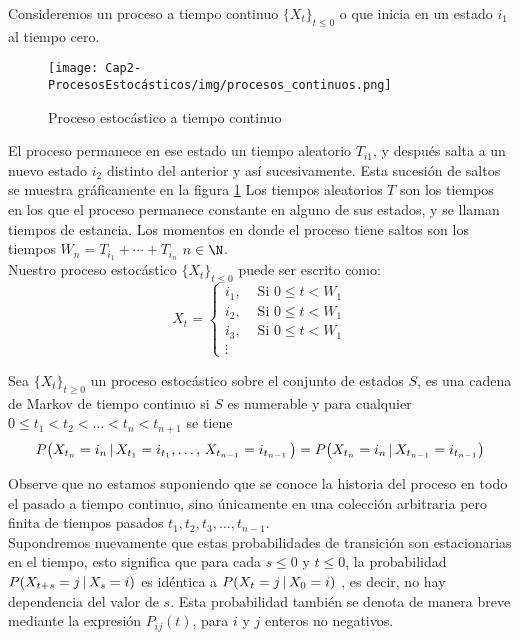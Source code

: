 Consideremos un proceso a tiempo continuo $\{X_t\}_{t\leq 0}$ o que inicia en un estado $i_1$  al tiempo cero.
\begin{figure}
    \centering
    \texttt{[image: Cap2-ProcesosEstocásticos/img/procesos\_continuos.png]}
    \caption{Proceso estocástico a tiempo continuo}
    \label{fig-procEstocastContinuo}
\end{figure}
El proceso permanece en ese estado un tiempo aleatorio $T_{i 1}$, y
después salta a un nuevo estado $i_2$ distinto del anterior y así sucesivamente. Esta
sucesión de saltos se muestra gráficamente en la figura \ref{fig-procEstocastContinuo}
Los tiempos aleatorios $T$ son los tiempos
en los que el proceso permanece constante en alguno de sus estados, y se llaman tiempos de estancia.
Los momentos en donde el proceso tiene saltos son los tiempos $W_n=T_{i_1}+\cdots+T_{i_n}$ $n\in\N$.\\
Nuestro proceso estocástico $\{X_t\}_{t\leq 0}$ puede ser escrito como:
 $$X_t =
 \begin{cases}
    i_1, & \mbox{ Si $0\leq t <W_1$}\\
    i_2, & \mbox{ Si $0\leq t <W_1$}\\
    i_3, & \mbox{ Si $0\leq t <W_1$}\\
    \vdots
 \end{cases}$$
\begin{Def}
    Sea $\{X_t\}_{t\geq 0}$ un proceso estocástico sobre el conjunto de estados $S$, es una cadena de Markov de tiempo continuo si $S$ es numerable y para cualquier $0\leq t_1<t_2<\ldots<t_n<t_{n+1}$ se tiene  $$P\big(X_{t_n}=i_n\thinspace|\thinspace X_{t_1}=i_{t_1},\ldots ,\thinspace X_{t_{n-1}}=i_{t_{n-1}}\thinspace \big)=P\big(X_{t_n}=i_n\thinspace|\thinspace X_{t_{n-1}}=i_{t_{n-1}}\big)$$
\end{Def}
Observe que no estamos suponiendo que se conoce la historia del proceso en todo el pasado a tiempo continuo, sino únicamente en una colección arbitraria pero finita de tiempos pasados $t_1,t_2,t_3,\ldots,t_{n-1}$.\\
Supondremos nuevamente que estas probabilidades de transición son estacionarias en el tiempo, esto significa que para cada $s\leq 0$ y $t\leq 0$, la probabilidad $P(X_{t+s} =j \thinspace|\thinspace X_s= i)$ 
es idéntica a $P(X _{t} =j \thinspace|\thinspace X_0= i)$ , es decir, no hay dependencia del valor de $s$.
Esta probabilidad también se denota de manera breve mediante la expresión $P_{i j}(t)$, para $i$ y $j$ enteros no negativos.\\
